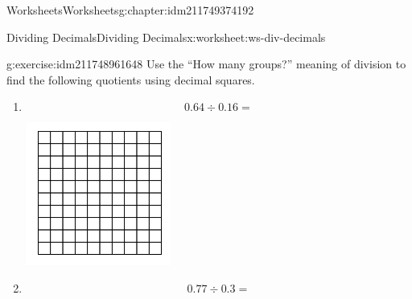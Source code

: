 \documentclass[twoside,11pt,]{book}
\begin{document}
\begin{chapterptx}{Worksheets}{}{Worksheets}{}{}{g:chapter:idm211749374192}
%
\begin{worksheet-section-numberless}{Dividing Decimals}{}{Dividing Decimals}{}{}{x:worksheet:ws-div-decimals}
\begin{divisionexercise}{1}{}{}{g:exercise:idm211748961648}%
Use the ``How many groups?'' meaning of division to find the following quotients using decimal squares.%
%
\begin{enumerate}[label=(\alph*)]
\item{}%
\begin{equation*}
0.64 \div 0.16 = 
\end{equation*}
\begin{sidebyside}{1}{0.3}{0.3}{0}%
\begin{sbspanel}{0.4}%
\includegraphics[width=1\linewidth]{images/decimal-square.png}
\end{sbspanel}%
\end{sidebyside}%
%
\item{}%
\begin{equation*}
0.77 \div 0.3 = 
\end{equation*}
\begin{sidebyside}{1}{0.3}{0.3}{0}%
\begin{sbspanel}{0.4}%

\end{sbspanel}
\end{sidebyside}
\end{enumerate}
\end{divisionexercise}
\end{worksheet-section-numberless}
\end{chapterptx}
\end{document}

